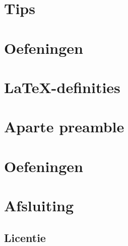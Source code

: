 \documentclass[
    dutch,
    everyoneauthor=true,
    darktheme,
    defaultSlideCollection=vincent,
    handout
]{../../cursuspresentatie}
\let\placetarget\relax
\let\placetarget\relax
\begin{document}
\def\placetarget{\hypertarget{shortcuts}{}}


\section{Tips}

\def\placetarget{\hypertarget{tips}{}}


\section{Oefeningen}

\def\placetarget{\hypertarget{oefeningen1}{}}


\section{\LaTeX-definities}

\def\placetarget{\hypertarget{LaTeXDefinities}{}}


\section{Aparte preamble}

\def\placetarget{\hypertarget{apartePreamble}{}}

\section{Oefeningen}

\def\placetarget{\hypertarget{oefeningen2}{}}




\section{Afsluiting}

\subsection{Licentie}
    
\end{document}
